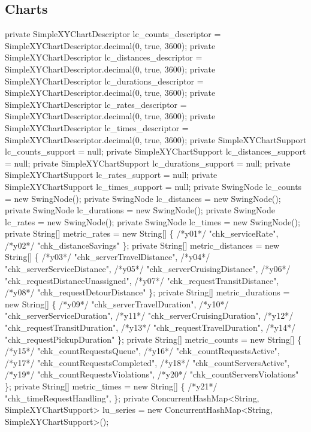 \subsection{Charts}
\nwenddocs{}\plusendmoddef
private SimpleXYChartDescriptor lc_counts_descriptor = SimpleXYChartDescriptor.decimal(0, true, 3600);
private SimpleXYChartDescriptor lc_distances_descriptor = SimpleXYChartDescriptor.decimal(0, true, 3600);
private SimpleXYChartDescriptor lc_durations_descriptor = SimpleXYChartDescriptor.decimal(0, true, 3600);
private SimpleXYChartDescriptor lc_rates_descriptor = SimpleXYChartDescriptor.decimal(0, true, 3600);
private SimpleXYChartDescriptor lc_times_descriptor = SimpleXYChartDescriptor.decimal(0, true, 3600);
private SimpleXYChartSupport lc_counts_support = null;
private SimpleXYChartSupport lc_distances_support = null;
private SimpleXYChartSupport lc_durations_support = null;
private SimpleXYChartSupport lc_rates_support = null;
private SimpleXYChartSupport lc_times_support = null;
private SwingNode lc_counts = new SwingNode();
private SwingNode lc_distances = new SwingNode();
private SwingNode lc_durations = new SwingNode();
private SwingNode lc_rates = new SwingNode();
private SwingNode lc_times = new SwingNode();
private String[] metric_rates = new String[] \{
/*y01*/      "chk_serviceRate",
/*y02*/      "chk_distanceSavings"
    \};
private String[] metric_distances = new String[] \{
/*y03*/      "chk_serverTravelDistance",
/*y04*/      "chk_serverServiceDistance",
/*y05*/      "chk_serverCruisingDistance",
/*y06*/      "chk_requestDistanceUnassigned",
/*y07*/      "chk_requestTransitDistance",
/*y08*/      "chk_requestDetourDistance"
    \};
private String[] metric_durations = new String[] \{
/*y09*/      "chk_serverTravelDuration",
/*y10*/      "chk_serverServiceDuration",
/*y11*/      "chk_serverCruisingDuration",
/*y12*/      "chk_requestTransitDuration",
/*y13*/      "chk_requestTravelDuration",
/*y14*/      "chk_requestPickupDuration"
    \};
private String[] metric_counts = new String[] \{
/*y15*/      "chk_countRequestsQueue",
/*y16*/      "chk_countRequestsActive",
/*y17*/      "chk_countRequestsCompleted",
/*y18*/      "chk_countServersActive",
/*y19*/      "chk_countRequestsViolations",
/*y20*/      "chk_countServersViolations"
    \};
private String[] metric_times = new String[] \{
/*y21*/      "chk_timeRequestHandling",
    \};
private ConcurrentHashMap<String, SimpleXYChartSupport> lu_series
  = new ConcurrentHashMap<String, SimpleXYChartSupport>();
\nwendcode{}\nwdocspar

